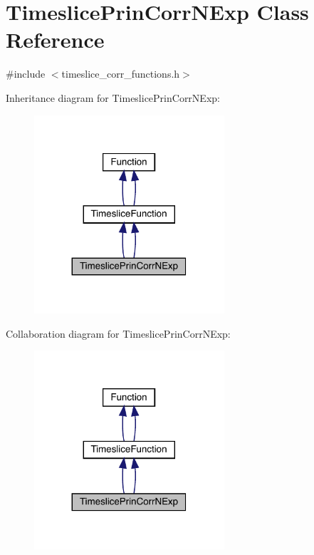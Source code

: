 \hypertarget{classTimeslicePrinCorrNExp}{}\section{Timeslice\+Prin\+Corr\+N\+Exp Class Reference}
\label{classTimeslicePrinCorrNExp}


{\ttfamily \#include $<$timeslice\+\_\+corr\+\_\+functions.\+h$>$}



Inheritance diagram for Timeslice\+Prin\+Corr\+N\+Exp\+:
\nopagebreak
\begin{figure}[H]
\begin{center}
\leavevmode
\includegraphics[width=200pt]{d5/d74/classTimeslicePrinCorrNExp__inherit__graph}
\end{center}
\end{figure}


Collaboration diagram for Timeslice\+Prin\+Corr\+N\+Exp\+:
\nopagebreak
\begin{figure}[H]
\begin{center}
\leavevmode
\includegraphics[width=200pt]{de/d4d/classTimeslicePrinCorrNExp__coll__graph}
\end{center}
\end{figure}
